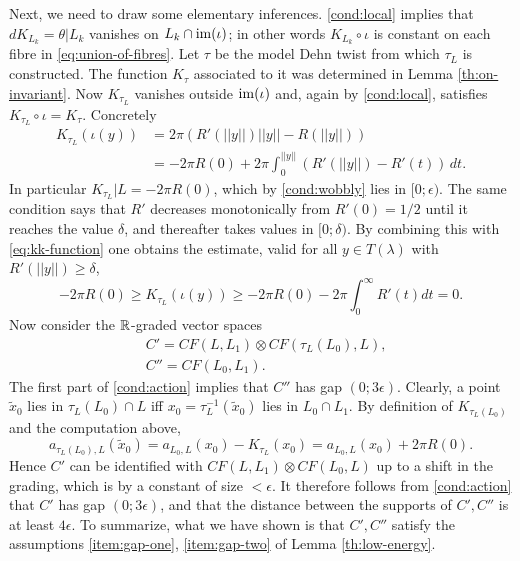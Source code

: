 \documentclass[10pt,letterpaper]{article}
\begin{document}
Next, we need to draw some elementary inferences. \ref{cond:local} implies that
$dK_{L_k} = \theta|L_k$ vanishes on $L_k \cap \mathrm{im}(\iota)$; in other words
$K_{L_k} \circ \iota$ is constant on each fibre in \eqref{eq:union-of-fibres}.
Let $\tau$ be the model Dehn twist from which $\tau_L$ is constructed. The
function $K_\tau$ associated to it was determined in Lemma
\ref{th:on-invariant}. Now $K_{\tau_L}$ vanishes outside $\mathrm{im}(\iota)$ and,
again by \ref{cond:local}, satisfies $K_{\tau_L} \circ \iota = K_\tau$.
Concretely
\begin{equation} \label{eq:kk-function}
\begin{aligned}
 K_{\tau_L}(\iota(y))
 &= 2\pi( R'(||y||)||y|| - R(||y||)) \\
 &= -2 \pi R(0) + 2\pi \int_0^{||y||} (R'(||y||) - R'(t))\, dt.
\end{aligned}
\end{equation}
In particular $K_{\tau_L}|L = -2\pi R(0)$, which by \ref{cond:wobbly} lies in
$[0;\epsilon)$. The same condition says that $R'$ decreases monotonically from
$R'(0) = 1/2$ until it reaches the value $\delta$, and thereafter takes values
in $[0;\delta)$. By combining this with \eqref{eq:kk-function} one obtains the
estimate, valid for all $y \in T(\lambda)$ with $R'(||y||) \geq \delta$,
\begin{equation} \label{eq:action-estimate}
-2\pi R(0) \geq K_{\tau_L}(\iota(y)) \geq -2\pi R(0) - 2\pi \int_0^{\infty}
R'(t) dt = 0.
\end{equation}
Now consider the $\mathbb{R}$-graded vector spaces
\begin{align*}
 & C' = CF(L,L_1) \otimes CF(\tau_L(L_0),L), \\
 & C'' = CF(L_0,L_1).
\end{align*}
The first part of \ref{cond:action} implies that $C''$ has gap $(0;3\epsilon)$.
Clearly, a point $\tilde{x}_0$ lies in $\tau_L(L_0) \cap L$ iff $x_0 =
\tau_L^{-1}(\tilde{x}_0)$ lies in $L_0 \cap L_1$. By definition of
$K_{\tau_L(L_0)}$ and the computation above,
\begin{equation} \label{eq:tau-acts}
 a_{\tau_L(L_0),L}(\tilde{x}_0) = a_{L_0,L}(x_0) - K_{\tau_L}(x_0) =
 a_{L_0,L}(x_0) + 2\pi R(0).
\end{equation}
Hence $C'$ can be identified with $CF(L,L_1) \otimes CF(L_0,L)$ up to a shift
in the grading, which is by a constant of size $<\epsilon$. It therefore
follows from \ref{cond:action} that $C'$ has gap $(0;3\epsilon)$, and that the
distance between the supports of $C',C''$ is at least $4\epsilon$. To
summarize, what we have shown is that $C',C''$ satisfy the assumptions
\ref{item:gap-one}, \ref{item:gap-two} of Lemma \ref{th:low-energy}.
\end{document}
